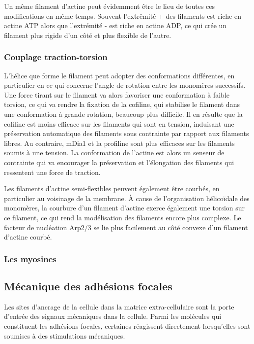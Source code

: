 Un même filament d'actine peut évidemment être le lieu de toutes ces modifications en même temps. Souvent l'extrêmité + des filaments est riche en actine ATP alors que l'extrémité - est riche en actine ADP, ce qui crée un filament plus rigide d'un côté et plus flexible de l'autre. 

\subsubsection{Couplage traction-torsion}

L'hélice que forme le filament peut adopter des conformations différentes, en particulier en ce qui concerne l'angle de rotation entre les monomères successifs. 
Une force tirant sur le filament va alors favoriser une conformation à faible torsion, ce qui va rendre la fixation de la cofiline, qui stabilise le filament dans une conformation à grande rotation, beaucoup plus difficile. 
Il en résulte que la cofiline est moins efficace sur les filaments qui sont en tension, induisant une préservation automatique des filaments sous contrainte par rapport aux filaments libres. 
Au contraire, mDia1 et la profiline sont plus efficaces sur les filaments soumis à une tension. 
La conformation de l'actine est alors un senseur de contrainte qui va encourager la préservation et l'élongation des filaments qui ressentent une force de traction. 

Les filaments d'actine semi-flexibles peuvent également être courbés, en particulier au voisinage de la membrane. 
À cause de l'organisation hélicoïdale des monomères, la courbure d'un filament d'actine exerce également une torsion sur ce filament, ce qui rend la modélisation des filaments encore plus complexe. 
Le facteur de nucléation Arp2/3 se lie plus facilement au côté convexe d'un filament d'actine courbé. 

\subsubsection{Les myosines}

\subsection{Mécanique des adhésions focales}

Les sites d'ancrage de la cellule dans la matrice extra-cellulaire sont la porte d'entrée des signaux mécaniques dans la cellule. Parmi les molécules qui constituent les adhésions focales, certaines réagissent directement lorsqu'elles sont soumises à des stimulations mécaniques. 


